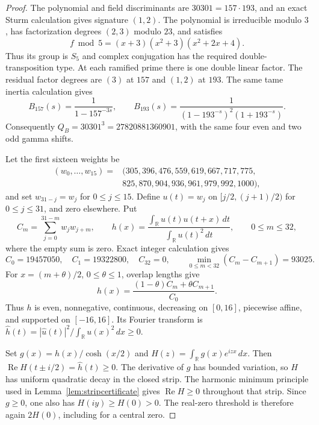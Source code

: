\documentclass[11pt]{article}
\theoremstyle{definition}
\theoremstyle{remark}
\newcommand{\R}{\mathbb R}
\newcommand{\dd}{\,d}
\newcommand{\Rea}{\operatorname{Re}}
\numberwithin{equation}{section}
\begin{document}
\begin{proof}
The polynomial and field discriminants are $30301=157\cdot193$, and an exact Sturm calculation gives signature $(1,2)$. The polynomial is irreducible modulo $3$, has factorization degrees $(2,3)$ modulo $23$, and satisfies
\[
f\bmod5=(x+3)(x^2+3)(x^2+2x+4).
\]
Thus its group is $S_5$ and complex conjugation has the required double-transposition type. At each ramified prime there is one double linear factor. The residual factor degrees are $(3)$ at $157$ and $(1,2)$ at $193$. The same tame inertia calculation gives
\[
B_{157}(s)=\frac1{1-157^{-3s}},\qquad
B_{193}(s)=\frac1{(1-193^{-s})^2(1+193^{-s})}.
\]
Consequently $Q_B=30301^3=27820881360901$, with the same four even and two odd gamma shifts.

Let the first sixteen weights be
\[
\begin{split}
(w_0,\ldots,w_{15})={}&(305,396,476,559,619,667,717,775,\\
&825,870,904,936,961,979,992,1000),
\end{split}
\]
and set $w_{31-j}=w_j$ for $0\le j\le15$. Define $u(t)=w_j$ on $[j/2,(j+1)/2)$ for $0\le j\le31$, and zero elsewhere. Put
\begin{equation}\label{eq:autocorr30301}
C_m=\sum_{j=0}^{31-m}w_jw_{j+m},\qquad
h(x)=\frac{\int_\R u(t)u(t+x)\dd t}{\int_\R u(t)^2\dd t},
\qquad 0\le m\le32,
\end{equation}
where the empty sum is zero. Exact integer calculation gives
\[
C_0=19457050,\quad C_1=19322800,\quad C_{32}=0,
\qquad\min_{0\le m<32}(C_m-C_{m+1})=93025.
\]
For $x=(m+\theta)/2$, $0\le\theta\le1$, overlap lengths give
\begin{equation}\label{eq:linearh30301}
h(x)=\frac{(1-\theta)C_m+\theta C_{m+1}}{C_0}.
\end{equation}
Thus $h$ is even, nonnegative, continuous, decreasing on $[0,16]$, piecewise affine, and supported on $[-16,16]$. Its Fourier transform is
$\widehat h(t)=|\widehat u(t)|^2/\int_\R u(x)^2\dd x\ge0$.

Set $g(x)=h(x)/\cosh(x/2)$ and $H(z)=\int_\R g(x)e^{izx}\dd x$. Then
$\Rea H(t\pm i/2)=\widehat h(t)\ge0$. The derivative of $g$ has bounded variation, so $H$ has uniform quadratic decay in the closed strip. The harmonic minimum principle used in Lemma~\ref{lem:stripcertificate} gives $\Rea H\ge0$ throughout that strip. Since $g\ge0$, one also has $H(iy)\ge H(0)>0$. The real-zero threshold is therefore again $2H(0)$, including for a central zero.


\end{proof}
\end{document}
